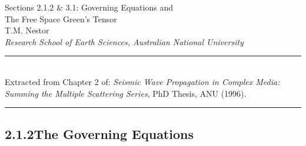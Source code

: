 \documentclass[11pt]{article}
\begin{document}
\begin{center}
{\Large Sections 2.1.2 \& 3.1: Governing Equations and\\
The Free Space Green's Tensor}\\[1.5em]
{\large T.M. Nestor}\\
{\it Research School of Earth Sciences, Australian National University}
\end{center}

\vspace{1em}
\noindent\rule{\textwidth}{0.4pt}\\[0.5em]
Extracted from Chapter 2 of: {\it Seismic Wave Propagation in Complex Media: Summing the Multiple
Scattering Series}, PhD Thesis, ANU (1996).\\[0.5em]
\noindent\rule{\textwidth}{0.4pt}


\subsection*{2.1.2\quad The Governing Equations}
\end{document}
